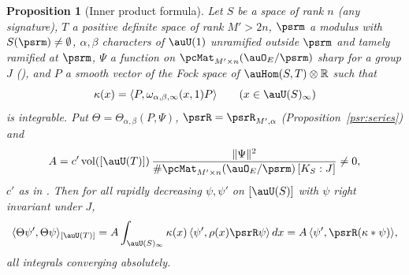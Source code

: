 \documentclass[10pt]{amsart}
\newtheorem{proposition}[theorem]{Proposition}
\theoremstyle{definition}
\theoremstyle{remark}
\newcommand{\R}{\mathbb R}
\begin{document}
\begin{proposition}[Inner product formula]\label{psr:rallis}
Let $S$ be a space of rank $n$ (any signature), $T$ a positive definite space of rank $M'>2n$,
$\psrm$ a modulus with $S(\psrm)\ne\emptyset$, $\alpha,\beta$ characters of $\auU(1)$ unramified outside
$\psrm$ and tamely ramified at $\psrm$, $\Psi$ a function on $\pcMat_{M'\times n}(\auO_E/\psrm)$ sharp for
a group $J$ ({\cite[Definition~2.15]{P53}}), and $P$ a smooth vector of the Fock space of
$\auHom(S,T)\otimes\R$ such that
\[
\kappa(x)=\langle P,\omega_{\alpha,\beta,\infty}(x,1)P\rangle\qquad(x\in\auU(S)_\infty)
\]
is integrable. Put $\Theta=\Theta_{\alpha,\beta}(P,\Psi)$, $\psrR=\psrR_{M',\alpha}$
(Proposition~\ref{psr:series}) and
\[
A=c'\,\mathrm{vol}([\auU(T)])\,\frac{\|\Psi\|^2}{\#\pcMat_{M'\times n}(\auO_E/\psrm)\,[K_S:J]}\ne0 ,
\]
$c'$ as in {\cite[Lemma~2.14(b)]{P53}}. Then for all rapidly decreasing $\psi,\psi'$ on $[\auU(S)]$ with $\psi$
right invariant under $J$,
\[
\langle\Theta\psi',\Theta\psi\rangle_{[\auU(T)]}=A\int_{\auU(S)_\infty}\kappa(x)\,\langle\psi',
\rho(x)\psrR\psi\rangle\,dx=A\,\langle\psi',\psrR(\kappa*\psi)\rangle ,
\]
all integrals converging absolutely.
\end{proposition}
\end{document}
